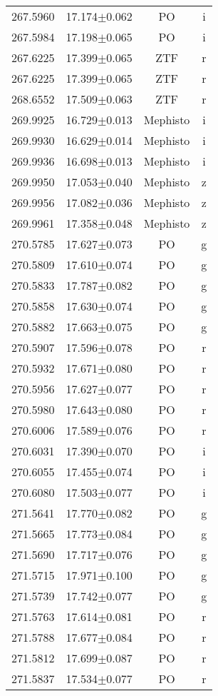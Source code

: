 \begin{table}
\begin{tabular}{cccc}
267.5960 & 17.174$\pm$0.062 & PO & i \\
267.5984 & 17.198$\pm$0.065 & PO & i \\
267.6225 & 17.399$\pm$0.065 & ZTF & r \\
267.6225 & 17.399$\pm$0.065 & ZTF & r \\
268.6552 & 17.509$\pm$0.063 & ZTF & r \\
269.9925 & 16.729$\pm$0.013 & Mephisto & i \\
269.9930 & 16.629$\pm$0.014 & Mephisto & i \\
269.9936 & 16.698$\pm$0.013 & Mephisto & i \\
269.9950 & 17.053$\pm$0.040 & Mephisto & z \\
269.9956 & 17.082$\pm$0.036 & Mephisto & z \\
269.9961 & 17.358$\pm$0.048 & Mephisto & z \\
270.5785 & 17.627$\pm$0.073 & PO & g \\
270.5809 & 17.610$\pm$0.074 & PO & g \\
270.5833 & 17.787$\pm$0.082 & PO & g \\
270.5858 & 17.630$\pm$0.074 & PO & g \\
270.5882 & 17.663$\pm$0.075 & PO & g \\
270.5907 & 17.596$\pm$0.078 & PO & r \\
270.5932 & 17.671$\pm$0.080 & PO & r \\
270.5956 & 17.627$\pm$0.077 & PO & r \\
270.5980 & 17.643$\pm$0.080 & PO & r \\
270.6006 & 17.589$\pm$0.076 & PO & r \\
270.6031 & 17.390$\pm$0.070 & PO & i \\
270.6055 & 17.455$\pm$0.074 & PO & i \\
270.6080 & 17.503$\pm$0.077 & PO & i \\
271.5641 & 17.770$\pm$0.082 & PO & g \\
271.5665 & 17.773$\pm$0.084 & PO & g \\
271.5690 & 17.717$\pm$0.076 & PO & g \\
271.5715 & 17.971$\pm$0.100 & PO & g \\
271.5739 & 17.742$\pm$0.077 & PO & g \\
271.5763 & 17.614$\pm$0.081 & PO & r \\
271.5788 & 17.677$\pm$0.084 & PO & r \\
271.5812 & 17.699$\pm$0.087 & PO & r \\
271.5837 & 17.534$\pm$0.077 & PO & r \\

\end{tabular}
\end{table}
